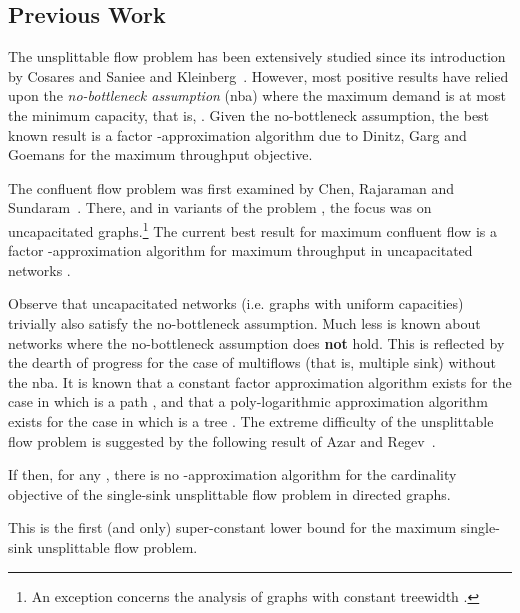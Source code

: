\documentclass[12pt]{article}
\newcommand{\nba}{{\sc nba}}
\begin{document}
\subsection{Previous Work}\label{sec:previous}
The unsplittable flow problem has been extensively studied since its
introduction by Cosares and Saniee \cite{cosares1994optimization} and Kleinberg~\cite{Kleinberg96}. However, most positive results
have relied upon the {\em no-bottleneck assumption} (\nba)
where the maximum demand is at most the minimum
capacity, that is, .
Given the no-bottleneck assumption, the best known result is a factor -approximation
algorithm due to Dinitz, Garg and Goemans \cite{Dinitz99} for the maximum throughput objective.






The confluent flow problem was first examined by Chen, Rajaraman and Sundaram~\cite{Chen05}.
There, and in variants of the problem \cite{Chen07, donovan2007degree, shepherd2009single},  the focus
was on  uncapacitated graphs.\footnote{An exception concerns the analysis of
graphs with constant treewidth \cite{dressler2010capacitated}.}
The current best result for maximum confluent flow is a factor -approximation
algorithm for maximum  throughput in uncapacitated networks \cite{Chen07}.

Observe that uncapacitated networks  (i.e. graphs with uniform capacities) trivially also satisfy
the no-bottleneck assumption. Much less is known about networks where the
no-bottleneck assumption does {\bf not} hold. This
is  reflected by the dearth of progress for the case of multiflows (that is, multiple sink)
without the \nba.
It is known that a constant factor approximation algorithm exists for the case in which
 is a path \cite{bonsma2011constant}, and that a poly-logarithmic approximation algorithm exists for the
case in which  is a tree \cite{chekuri2009unsplittable}.
The extreme difficulty of the unsplittable flow problem is suggested by the following
result of Azar and Regev~\cite{azar2001strongly}.
\begin{thm}\label{thm:ar}
If  then, for any , there is no -approximation algorithm for the cardinality objective
of the single-sink unsplittable flow problem in directed graphs.
\end{thm}
This is the first (and only) super-constant lower bound for the maximum single-sink unsplittable flow problem.
\end{document}
